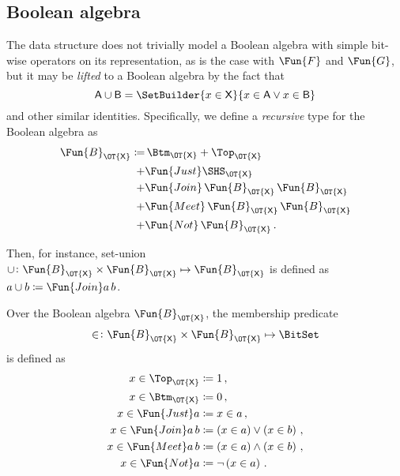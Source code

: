 \documentclass[ ../main.tex]{subfiles}
\begin{document}
\subsection{Boolean algebra}
The data structure does not trivially model a Boolean algebra with simple bit-wise operators on its representation, as is the case with $\Fun{F}$ and $\Fun{G}$, but it may be \emph{lifted} to a Boolean algebra by the fact that
\begin{equation}
\Set{A} \SetUnion \Set{B} = \SetBuilder{x \in {\Set{X}}}{x \in \Set{A} \lor x \in \Set{B}}
\end{equation}
and other similar identities.
Specifically, we define a \emph{recursive} type for the Boolean algebra as
\begin{align}
\Fun{B}_{\OT{\Set{X}}} \coloneqq & \, \Btm_{\OT{\Set{X}}} + \Top_{\OT{\Set{X}}} \\
+ & \Fun{Just} \SHS_{\OT{\Set{X}}} \\
+ & \Fun{Join} \, \Fun{B}_{\OT{\Set{X}}} \, \Fun{B}_{\OT{\Set{X}}} \\
+ & \Fun{Meet} \, \Fun{B}_{\OT{\Set{X}}} \, \Fun{B}_{\OT{\Set{X}}} \\
+ & \Fun{Not}  \, \Fun{B}_{\OT{\Set{X}}} \,.
\end{align}

Then, for instance, set-union $\SetUnion \colon \Fun{B}_{\OT{\Set{X}}} \times \Fun{B}_{\OT{\Set{X}}} \mapsto \Fun{B}_{\OT{\Set{X}}}$ is defined as $a \SetUnion b \coloneqq \Fun{Join} a \, b$.

Over the Boolean algebra $\Fun{B}_{\OT{\Set{X}}}$, the membership predicate
\begin{equation}
\SetContains \colon \Fun{B}_{\OT{\Set{X}}} \times \Fun{B}_{\OT{\Set{X}}} \mapsto \BitSet
\end{equation}
is defined as
\begin{align}
x \SetContains \Top_{\OT{\Set{X}}} 	& \coloneqq 1\,,\\
x \SetContains \Btm_{\OT{\Set{X}}} 	& \coloneqq 0\,,\\	
x \SetContains \Fun{Just} a		   	& \coloneqq x \SetContains a\,,\\
x \SetContains \Fun{Join} a \, b 	& \coloneqq \left(x \SetContains a\right) \lor
\left(x \SetContains b\right)\,,\\
x \SetContains \Fun{Meet} a \, b 	& \coloneqq \left(x \SetContains a\right) \land
\left(x \SetContains b\right)\,,\\
x \SetContains \Fun{Not} a		 	& \coloneqq \neg \left(x \SetContains a\right)\,.
\end{align}
\end{document}
